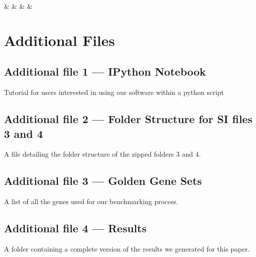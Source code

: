 \documentclass{bmcart}
\begin{document}
\begin{backmatter}
\begin{table}[h!]
	\begin{adjustbox}{width=1\textwidth}
		\centering
		{\csvcoli & \csvcolii & \csvcoliii & \csvcoliv & \csvcolv}	
		\label{tab:interagree}
	\end{adjustbox}
\end{table}


\section*{Additional Files}
  \subsection*{Additional file 1 --- IPython Notebook}
    Tutorial for users interested in using our software within a python script
  \subsection*{Additional file 2 --- Folder Structure for SI files 3 and 4}
    A file detailing the folder structure of the zipped folders 3 and 4. 
  \subsection*{Additional file 3 --- Golden Gene Sets}
    A list of all the genes used for our benchmarking process. 
  \subsection*{Additional file 4 --- Results}
    A folder containing a complete version of the results we generated for this paper. 


\end{backmatter}
\end{document}
